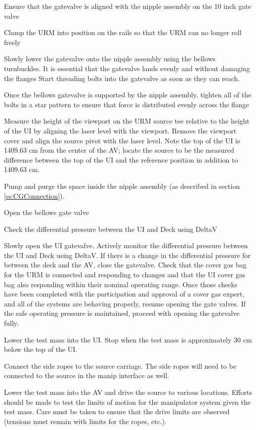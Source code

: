 \documentclass[11pt]{article}
\begin{document}
\begin{answerlist}
\item Ensure that the gatevalve is aligned with the nipple assembly on the 10 inch gate valve
\item Clamp the URM into position on the rails so that the URM can no longer roll freely
\item Slowly lower the gatevalve onto the nipple assembly using the bellows turnbuckles. It is essential that the gatevalve lands evenly and without damaging the flanges Start threading bolts into the gatevalve as soon as they can reach.
\item Once the bellows gatevalve is supported by the nipple assembly, tighten all of the bolts in a star pattern to ensure that force is distributed evenly across the flange
\item Measure the height of the viewport on the URM source tee relative to the height of the UI by aligning the laser level with the viewport. Remove the viewport cover and align the source pivot with the laser level. Note the top of the UI is 1409.63 cm from the center of the AV; locate the source to be the measured difference between the top of the UI and the reference position in addition to 1409.63 cm.
\item Pump and purge the space inside the nipple assembly (as described in section \ref{ss:CGConnection}).
\item Open the bellows gate valve
\item Check the differential pressure between the UI and Deck using DeltaV
\item Slowly open the UI gatevalve. Actively monitor the differential pressure between the UI and Deck using DeltaV. If there is a change in the differential pressure for between the deck and the AV, close the gatevalve. Check that the cover gas bag for the URM is connected and responding to changes and that the UI cover gas bag also responding within their nominal operating range. Once those checks have been completed with the participation and approval of a cover gas expert, and all of the systems are behaving properly, resume opening the gate valves. If the safe operating pressure is maintained, proceed with opening the gatevalve fully.
\item Lower the test mass into the UI. Stop when the test mass is approximately 30 cm below the top of the UI.
\item Connect the side ropes to the source carriage. The side ropes will need to be connected to the source in the manip interface as well.
\item Lower the test mass into the AV and drive the source to various locations. Efforts should be made to test the limits of motion for the manipulator system given the test mass. Care must be taken to ensure that the drive limits are observed (tensions must remain with limits for the ropes, etc.).

\end{answerlist}
\end{document}
